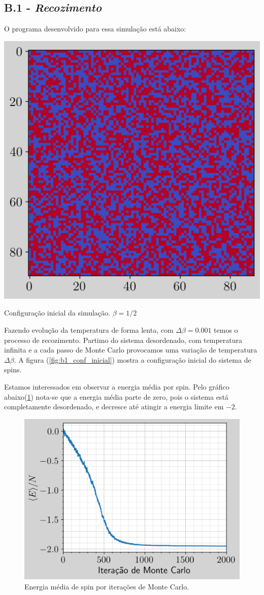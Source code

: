 \subsection{B.1 - \emph{Recozimento}}
O programa desenvolvido para essa simulação está abaixo: 

\begin{marginfigure}
    \includegraphics[width=0.8\linewidth]{graficos/tarefa-2/graf-tarefa-B1-conf-inicial.png}
    \caption{Configuração inicial da simulação. $\beta = 1/2$ }
    \label{fig:b1_conf_inicial}
\end{marginfigure}



Fazendo evolução da temperatura de forma lenta, com $\Delta \beta = 0.001$ temos o processo de recozimento. 
Partimo do sistema desordenado, com temperatura infinita e a cada passo de Monte Carlo provocamos uma variação
de temperatura $\Delta \beta$. A figura (\ref{fig:b1_conf_inicial}) mostra a configuração inicial do sistema de spins.



Estamos interessados em observar a energia média por spin. Pelo gráfico 
abaixo(\ref{fig:tarefa_b1_graf_energia}) nota-se que a energia média parte de zero, pois o sistema 
está completamente desordenado, e decresce até atingir  a energia limite em $-2$. 

\begin{figure}
    \centering
    \includegraphics[width=0.6\linewidth]{graficos/tarefa-2/graf-tarefa-B1-mag-eng.png}
    \caption{Energia média de spin por iterações de Monte Carlo.}
    \label{fig:tarefa_b1_graf_energia}
\end{figure}


